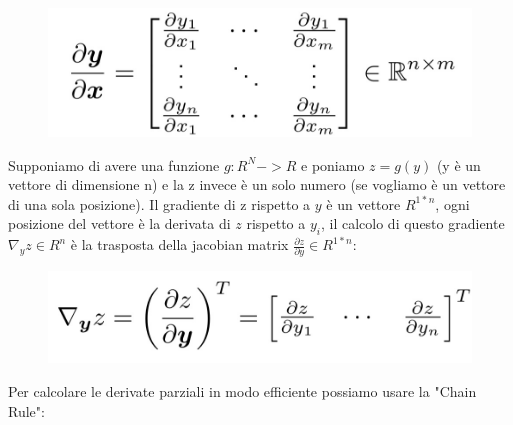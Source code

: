 \documentclass[14pt]{extreport}
\begin{document}
\begin{figure}[H]
	\centering
	\includegraphics[width=0.7\linewidth]{380.jpeg}
\end{figure}

Supponiamo di avere una funzione $g: R^N->R$ e poniamo $z=g(y)$ (y è un vettore di dimensione n) e la z invece è un solo numero (se vogliamo è un
vettore di una sola posizione). Il gradiente di z rispetto a $y$ è un vettore $R^{1*n}$, ogni posizione del vettore è la derivata di $z$ rispetto a
$y_i$, il calcolo di questo gradiente $\nabla_y z \in R^n$ è la trasposta della jacobian matrix $\frac{\partial z}{\partial y} \in R^{1*n}$:

\begin{figure}[H]
	\centering
	\includegraphics[width=0.7\linewidth]{381.jpeg}
\end{figure}

Per calcolare le derivate parziali in modo efficiente possiamo usare la "Chain Rule":
\end{document}
